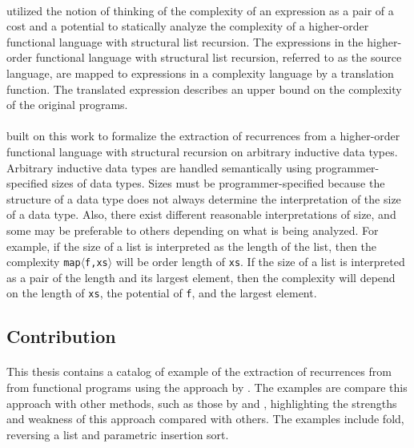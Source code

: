 \paragraph{}
\citet{Danner2013} utilized the notion of thinking of the complexity of an expression as a pair of a cost and a potential to statically analyze the complexity of a higher-order functional language with structural list recursion.
The expressions in the higher-order functional language with structural list recursion, referred to as the source language, are mapped to expressions in a complexity language by a translation function.
The translated expression describes an upper bound on the complexity of the original programs.

\paragraph{}
\citet{Danner2015} built on this work to formalize the extraction of recurrences from a higher-order functional language with structural recursion on arbitrary inductive data types.
Arbitrary inductive data types are handled semantically using programmer-specified sizes of data types.
Sizes must be programmer-specified because the structure of a data type does not always determine the interpretation of the size of a data type.
Also, there exist different reasonable interpretations of size, and some may be preferable to others depending on what is being analyzed.
For example, if the size of a list is interpreted as the length of the list, then the complexity \texttt{map$\langle$f,xs$\rangle$} will be order length of \texttt{xs}.
If the size of a list is interpreted as a pair of the length and its largest element, then the complexity will depend on the length of \texttt{xs}, the potential of \texttt{f}, and the largest element.


\subsection*{Contribution}

\paragraph{}
This thesis contains a catalog of example of the extraction of recurrences from from functional programs using the approach by \citet{Danner2015}. The examples are compare this approach with other methods, such as those by \citet{Avanzini2015} and \citet{HoffHof2010}, highlighting the strengths and weakness of this approach compared with others. The examples include fold, reversing a list and parametric insertion sort.

